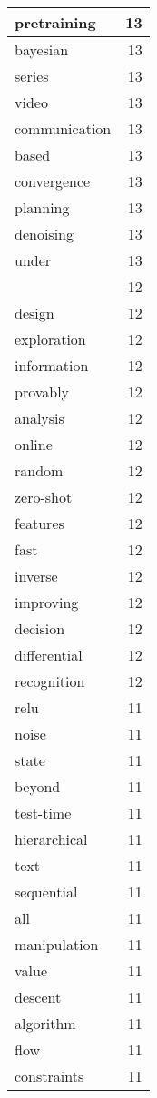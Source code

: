 \begin{table}[h]
\begin{tabular}{|l|r|}
\hline
pretraining & 13 \\
\hline
bayesian & 13 \\
\hline
series & 13 \\
\hline
video & 13 \\
\hline
communication & 13 \\
\hline
based & 13 \\
\hline
convergence & 13 \\
\hline
planning & 13 \\
\hline
denoising & 13 \\
\hline
under & 13 \\
\hline
 & 12 \\
\hline
design & 12 \\
\hline
exploration & 12 \\
\hline
information & 12 \\
\hline
provably & 12 \\
\hline
analysis & 12 \\
\hline
online & 12 \\
\hline
random & 12 \\
\hline
zero-shot & 12 \\
\hline
features & 12 \\
\hline
fast & 12 \\
\hline
inverse & 12 \\
\hline
improving & 12 \\
\hline
decision & 12 \\
\hline
differential & 12 \\
\hline
recognition & 12 \\
\hline
relu & 11 \\
\hline
noise & 11 \\
\hline
state & 11 \\
\hline
beyond & 11 \\
\hline
test-time & 11 \\
\hline
hierarchical & 11 \\
\hline
text & 11 \\
\hline
sequential & 11 \\
\hline
all & 11 \\
\hline
manipulation & 11 \\
\hline
value & 11 \\
\hline
descent & 11 \\
\hline
algorithm & 11 \\
\hline
flow & 11 \\
\hline
constraints & 11 \\

\end{tabular}
\end{table}
